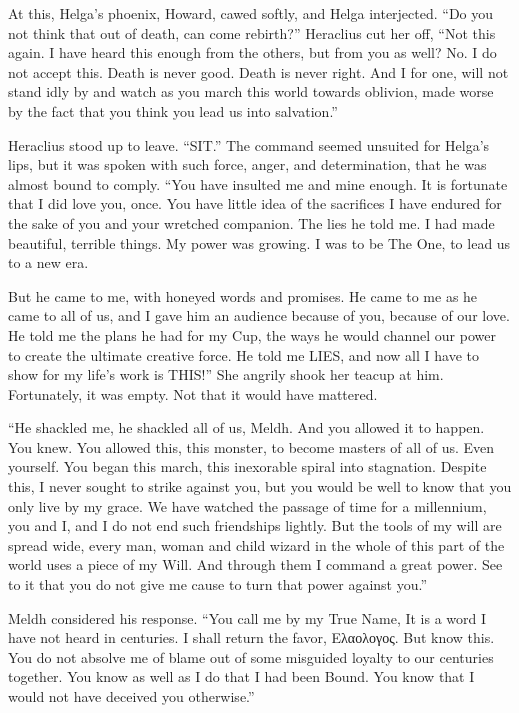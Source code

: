 At this, Helga’s phoenix, Howard, cawed softly, and Helga interjected. “Do you not think that out of death, can come rebirth?” Heraclius cut her off, “Not this again. I have heard this enough from the others, but from you as well? No. I do not accept this. Death is never good. Death is never right. And I for one, will not stand idly by and watch as you march this world towards oblivion, made worse by the fact that you think you lead us into salvation.”

Heraclius stood up to leave. “SIT.” The command seemed unsuited for Helga’s lips, but it was spoken with such force, anger, and determination, that he was almost bound to comply. “You have insulted me and mine enough. It is fortunate that I did love you, once. You have little idea of the sacrifices I have endured for the sake of you and your wretched companion. The lies he told me. I had made beautiful, terrible things. My power was growing. I was to be The One, to lead us to a new era.

But he came to me, with honeyed words and promises. He came to me as he came to all of us, and I gave him an audience because of you, because of our love. He told me the plans he had for my Cup, the ways he would channel our power to create the ultimate creative force. He told me LIES, and now all I have to show for my life’s work is THIS!” She angrily shook her teacup at him. Fortunately, it was empty. Not that it would have mattered.

“He shackled me, he shackled all of us, Meldh. And you allowed it to happen. You knew. You allowed this, this monster, to become masters of all of us. Even yourself. You began this march, this inexorable spiral into stagnation. Despite this, I never sought to strike against you, but you would be well to know that you only live by my grace. We have watched the passage of time for a millennium, you and I, and I do not end such friendships lightly. But the tools of my will are spread wide, every man, woman and child wizard in the whole of this part of the world uses a piece of my Will. And through them I command a great power. See to it that you do not give me cause to turn that power against you.”

Meldh considered his response. “You call me by my True Name, It is a word I have not heard in centuries. I shall return the favor, Ελαολογος. But know this. You do not absolve me of blame out of some misguided loyalty to our centuries together. You know as well as I do that I had been Bound. You know that I would not have deceived you otherwise.”

